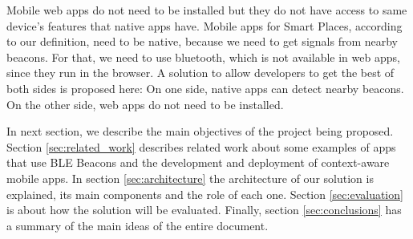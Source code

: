 Mobile web apps do not need to be
installed but they do not have access
to same device's features that native apps have.
Mobile apps for Smart Places, according to our definition,
need to be native, because we need to get signals from
nearby beacons. For that, we need to use bluetooth, which is
not available in web apps, since they run in the browser.
A solution to allow developers to get the best of both sides
is proposed here: On one side,
native apps can detect nearby beacons. On the other side,
web apps do not need to be installed.

In next section, we describe the main
objectives of the project being proposed.
Section \ref{sec:related_work} describes related
work about some examples of apps that use BLE Beacons
and the development and deployment of
context-aware mobile apps.
In section \ref{sec:architecture} the architecture of our
solution is explained, 
its main components and the role of
each one.
Section \ref{sec:evaluation} is about how the solution
will be evaluated.
Finally, section \ref{sec:conclusions} has a summary of
the main ideas of the entire document.
